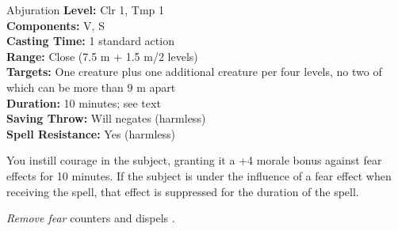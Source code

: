 {Abjuration}
{
	\textbf{Level:}
	Clr 1, Tmp 1\\
	\textbf{Components:}
	V, S\\
	\textbf{Casting Time:}
	1 standard action\\
	\textbf{Range:}
	Close (7.5 m + 1.5 m/2 levels)\\
	\textbf{Targets:}
	One creature plus one additional creature per four levels, no two of which can be more than 9 m apart\\
	\textbf{Duration:}
	10 minutes; see text\\
	\textbf{Saving Throw:}
	Will negates (harmless)\\
	\textbf{Spell Resistance:}
	Yes (harmless)\\
}
{
	You instill courage in the subject, granting it a +4 morale bonus against fear effects for 10 minutes. If the subject is under the influence of a fear effect when receiving the spell, that effect is suppressed for the duration of the spell.

	\emph{Remove fear} counters and dispels .

}
